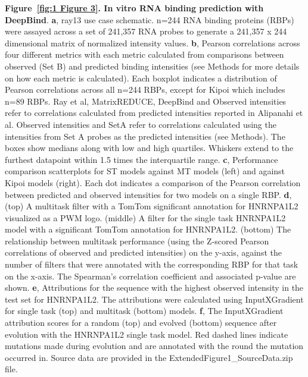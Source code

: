 \thispagestyle{plain}
\noindent
\textbf{Figure~\ref{fig:1 Figure 3}. In vitro RNA binding prediction with DeepBind}. \textbf{a}, ray13 use case schematic. n=244 RNA binding proteins (RBPs) were assayed across a set of 241,357 RNA probes to generate a 241,357 x 244 dimensional matrix of normalized intensity values. \textbf{b}, Pearson correlations across four different metrics with each metric calculated from comparisons between observed (Set B) and predicted binding intensities (see Methods for more details on how each metric is calculated). Each boxplot indicates a distribution of Pearson correlations across all n=244 RBPs, except for Kipoi which includes n=89 RBPs. Ray et al, MatrixREDUCE, DeepBind and Observed intensities refer to correlations calculated from predicted intensities reported in Alipanahi et al. Observed intensities and SetA refer to correlations calculated using the intensities from Set A probes as the predicted intensities (see Methods). The boxes show medians along with low and high quartiles. Whiskers extend to the furthest datapoint within 1.5 times the interquartile range. \textbf{c}, Performance comparison scatterplots for ST models against MT models (left) and against Kipoi models (right). Each dot indicates a comparison of the Pearson correlation between predicted and observed intensities for two models on a single RBP. \textbf{d}, (top) A multitask filter with a TomTom significant annotation for HNRNPA1L2 visualized as a PWM logo. (middle) A filter for the single task HNRNPA1L2 model with a significant TomTom annotation for HNRNPA1L2. (bottom) The relationship between multitask performance (using the Z-scored Pearson correlations of observed and predicted intensities) on the y-axis, against the number of filters that were annotated with the corresponding RBP for that task on the x-axis. The Spearman’s correlation coefficient and associated p-value are shown. \textbf{e}, Attributions for the sequence with the highest observed intensity in the test set for HNRNPA1L2. The attributions were calculated using InputXGradient for single task (top) and multitask (bottom) models. \textbf{f}, The InputXGradient attribution scores for a random (top) and evolved (bottom) sequence after evolution with the HNRNPA1L2 single task model. Red dashed lines indicate mutations made during evolution and are annotated with the round the mutation occurred in. Source data are provided in the ExtendedFigure1\_SourceData.zip file.

\clearpage

